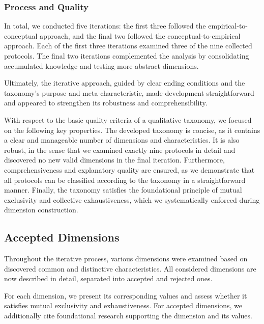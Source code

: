 \documentclass[pdflatex,sn-mathphys-num]{sn-jnl}%
\theoremstyle{thmstyleone}%
\theoremstyle{thmstyletwo}%
\theoremstyle{thmstylethree}%
\begin{document}
\subsubsection{Process and Quality}

In total, we conducted five iterations: the first three followed the empirical-to-conceptual approach, and the final two followed the conceptual-to-empirical approach. Each of the first three iterations examined three of the nine collected protocols. The final two iterations complemented the analysis by consolidating accumulated knowledge and testing more abstract dimensions.

Ultimately, the iterative approach, guided by clear ending conditions and the taxonomy's purpose and meta-characteristic, made development straightforward and appeared to strengthen its robustness and comprehensibility.

With respect to the basic quality criteria of a qualitative taxonomy, we focused on the following key properties. The developed taxonomy is concise, as it contains a clear and manageable number of dimensions and characteristics. 
It is also robust, in the sense that we examined exactly nine protocols in detail and discovered no new valid dimensions in the final iteration. Furthermore, comprehensiveness and explanatory quality are ensured, as we demonstrate that all protocols can be classified according to the taxonomy in a straightforward manner. Finally, the taxonomy satisfies the foundational principle of mutual exclusivity and collective exhaustiveness, which we systematically enforced during dimension construction.


\subsection{Accepted Dimensions}
\label{sec:taxonomy-design-accepted-dimensions}

Throughout the iterative process, various dimensions were examined based on discovered common and distinctive characteristics. 
All considered dimensions are now described in detail, separated into accepted and rejected ones.

For each dimension, we present its corresponding values and assess whether it satisfies mutual exclusivity and exhaustiveness. For accepted dimensions, we additionally cite foundational research supporting the dimension and its values.
\end{document}
